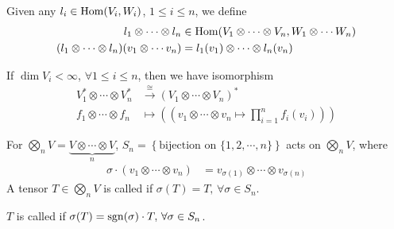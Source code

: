 Given any  $ l_i\in \mathrm{Hom}(V_i,W_i) $, $ 1 \leq i \leq n $, we define 
\begin{equation}
    \begin{aligned}
        l_1\otimes\cdots \otimes l_n&\in \mathrm{Hom}(V_1\otimes \cdots \otimes V_n,W_1\otimes \cdots W_n)\\
        (l_1\otimes\cdots \otimes l_n)(v_1\otimes \cdots v_n)&=l_1(v_1)\otimes \cdots \otimes l_n(v_n)
    \end{aligned}
\end{equation}  
\begin{proposition}
    If  $ \dim V_i<\infty $,  $ \forall 1 \leq i \leq n $, then we have isomorphism 
    \begin{equation}
        \begin{aligned}
            V_1^*\otimes \cdots \otimes V_n^*&\xrightarrow{\cong}(V_1\otimes \cdots \otimes V_n)^*\\
            f_1\otimes \cdots \otimes f_n&\mapsto \left((v_1\otimes \cdots \otimes v_n\mapsto \prod_{i=1}^nf_i(v_i))\right)
        \end{aligned}
    \end{equation}
\end{proposition}
For  $ \bigotimes\limits_{n}V=\underbrace{V\otimes\cdots \otimes V}_{n} $,  $ S_n=\left\{\text{bijection on }\{1,2,\cdots,n\}\right\} $ acts on  $ \bigotimes\limits_n V $, where 
\begin{equation}
    \begin{aligned}
        \sigma\cdot (v_1\otimes \cdots \otimes v_n)&=v_{\sigma(1)}\otimes \cdots \otimes v_{\sigma(n)}
    \end{aligned}
\end{equation} 
A tensor  $ T\in \bigotimes\limits_n V$ is called  if  $ \sigma(T)=T,\,\forall \sigma\in S_n $.

$ T $ is called  if  $ \sigma(T)=\mathrm{sgn}(\sigma)\cdot T ,\,\forall \sigma\in S_n $.

